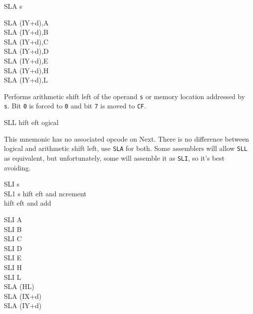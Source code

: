 \begin{basedescript}{
	\desclabelstyle{\multilinelabel}
	\desclabelwidth{3cm}}
\begin{DetailItem}{SLA s}
\begin{DetailVariants}
			\columnbreak
			SLA (IY+d),A\UNDOC\\
			SLA (IY+d),B\UNDOC\\
			SLA (IY+d),C\UNDOC\\
			SLA (IY+d),D\UNDOC\\
			SLA (IY+d),E\UNDOC\\
			SLA (IY+d),H\UNDOC\\
			SLA (IY+d),L\UNDOC
		\end{DetailVariants}

		Performs arithmetic shift left of the operand {\tt s} or memory location addressed by {\tt s}. Bit {\tt 0} is forced to {\tt 0} and bit {\tt 7} is moved to {\tt CF}.

		\begin{DetailEffects}[p]
			\FlagsSLAr
		\end{DetailEffects}
						
		\begin{DetailTiming}
		\end{DetailTiming}

	\end{DetailItem}

	\begin{DetailItem}{SLL}
		{hift \IH{L}eft ogical}
		{}

		This mnemonic has no associated opcode on Next. There is no difference between logical and arithmetic shift left, use {\tt SLA} for both. Some assemblers will allow {\tt SLL} as equivalent, but unfortunately, some will assemble it as {\tt SLI}, so it's best avoiding.
		
	\end{DetailItem}

	\pagebreak
	\begin{DetailItem}{SLI s\UNDOC\\SL1 s\UNDOC}
		{hift eft and ncrement\\
		hift eft and add }
		{}
		
		\begin{DetailVariants}
			SLI A\\
			SLI B\\
			SLI C\\
			SLI D\\
			SLI E\\
			SLI H\\
			SLI L\\
			SLA (HL)\\
			SLA (IX+d)\\
			SLA (IY+d)


\end{DetailVariants}
\end{DetailItem}
\end{basedescript}
